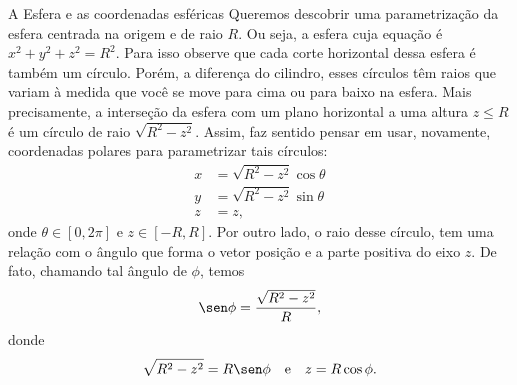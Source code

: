\begin{example}{A Esfera e as coordenadas esféricas}{}
Queremos descobrir uma parametrização da esfera centrada na origem e de raio $R$. Ou seja, a esfera cuja equação é $x^2+y^2+z^2=R^2$. 
Para isso observe que cada corte horizontal dessa esfera é também um círculo. Porém, a diferença do cilindro, esses círculos têm raios que variam à medida que você se move para cima ou para baixo na esfera. Mais precisamente, a interseção da esfera com um plano horizontal a uma altura $z\leq R$ é um círculo de raio $\sqrt{R^2-z^2}$. 
Assim, faz sentido pensar em usar, novamente, coordenadas polares para parametrizar tais círculos: 
\begin{align*}
x &= \sqrt{R^2-z^2}\cos\theta \\
y &= \sqrt{R^2-z^2} \sin\theta \\
z &= z,
\end{align*}
onde $\theta\in[0,2\pi]$ e $z\in[-R,R]$. 
Por outro lado, o raio desse círculo, tem uma relação com o ângulo que forma o vetor posição e a parte positiva do eixo $z$. De fato, chamando tal ângulo de $\phi$, temos 
$$\sen \phi = \dfrac{\sqrt{R^2-z^2}}{R}, $$
donde
$$\sqrt{R^2-z^2}=R\sen \phi \quad \mbox{e} \quad z=R\cos \phi.$$


\begin{center}
    
\begin{comment}\begin{tikzpicture}[tdplot_main_coords,scale=3]

\draw[red!140] plot[domain=-pi/2:-6*pi/4,smooth,variable=\t] ({sqrt(1-(sqrt(2)/2)^2) * cos(\t r)},{sqrt(1-(sqrt(2)/2)^2) * sin(\t r)},{sqrt(2)/2}); 
  \pgfmathsetmacro{\tini}{0.5*pi}
		\pgfmathsetmacro{\tfin}{1.85*pi}
		\pgfmathsetmacro{\tend}{2.5*pi}
		\draw[-latex] (0,0,0) -- (2,0,0) node [below left] {$x$};
		\draw[dashed] (0,0,0) -- (-1.25,0,0);
		\draw[-latex] (0,0,0) -- (0,1.5,0) node [right] {$y$};
		\draw[dashed] (0,0,0) -- (0,-1.25,0);
		\foreach \altura in {0.0125,0.025,...,1.0}{
			\pgfmathparse{sqrt(1-\altura^2)}
			\pgfmathsetmacro{\radio}{\pgfmathresult}
			\draw[blue!50,opacity=0.5] plot[domain=\tini:\tfin,smooth,variable=\t] ({\radio*cos(\t r)},{\radio*sin(\t r)},{\altura}); 
		}
  

\end{comment}
\end{center}
\end{example}
